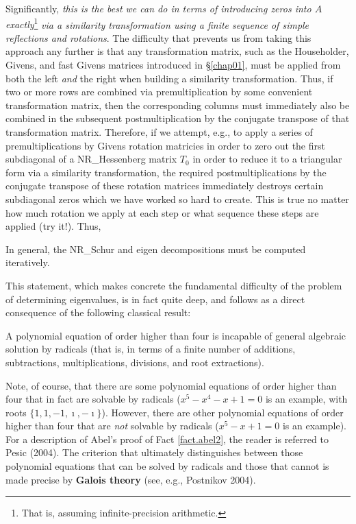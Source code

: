 Significantly, {\it this is the best we can do in terms of introducing zeros into $A$ exactly}\footnote{That is, assuming infinite-precision
arithmetic.} {\it via a similarity transformation using a finite sequence of simple reflections and rotations}.  The difficulty that prevents
us from taking this approach any further is that any transformation matrix, such as the Householder, Givens, and fast Givens matrices introduced in
\S \ref{chap01}, must be applied from both the left {\it and} the right when building a similarity transformation.  Thus, if two or more rows are combined
via premultiplication by some convenient transformation matrix, then the corresponding columns must immediately also be combined in the subsequent
postmultiplication by the 
conjugate transpose of that transformation matrix.  Therefore, if we attempt, e.g., to apply a series of premultiplications by Givens rotation matricies in
order to zero out the first subdiagonal of a NR_Hessenberg matrix $T_0$ in order to reduce it to a triangular form via a similarity transformation, the required
postmultiplications by the conjugate transpose of these rotation matrices immediately destroys certain subdiagonal zeros which we have worked so hard
to create.  This is true no matter how much rotation we apply at each step or what sequence these steps are applied (try it!).  Thus,

\begin{fact} \label{fact.abel1}
In general, the NR_Schur and eigen decompositions must be computed iteratively.
\end{fact}

\noindent This statement, which makes concrete the fundamental difficulty of the problem of determining eigenvalues,
is in fact quite deep, and follows as a direct consequence of the following classical result: 

\begin{fact} \label{fact.abel2} 
A polynomial equation of order higher than four is incapable of general algebraic solution by radicals
(that is, in terms of a finite number of additions, subtractions, multiplications, divisions, and root extractions). 
\end{fact}

\noindent Note, of course, that there are some polynomial equations of order higher than four that in fact are solvable
by radicals ($x^5-x^4-x+1=0$ is an example, with roots $\{1,1,-1,\imath,-\imath\}$).
However, there are other polynomial equations of order higher than four that are {\it not} solvable by radicals ($x^5-x+1=0$ is an example).
For a description of Abel's proof of Fact \ref{fact.abel2}, the reader is referred to Pesic (2004).
The criterion that ultimately distinguishes between those polynomial equations that can be solved by radicals and those that cannot is made precise
by {\bf Galois theory} (see, e.g., Postnikov 2004).

